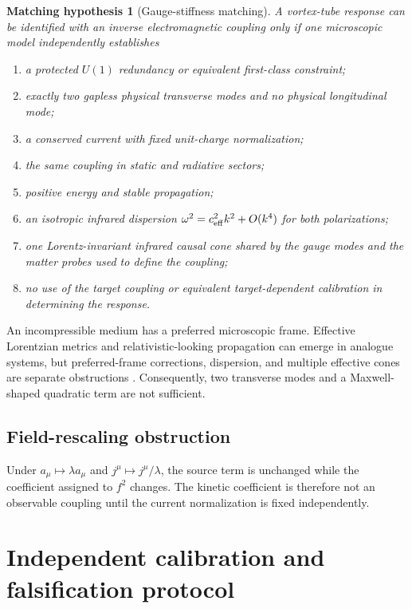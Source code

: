 \documentclass[aps,pre,preprint,notitlepage,nofootinbib,superscriptaddress]{revtex4-2}
\newtheorem{hypothesis}{Matching hypothesis}
\begin{document}
\begin{hypothesis}[Gauge-stiffness matching]
A vortex-tube response can be identified with an inverse electromagnetic coupling only if one microscopic model independently establishes
\begin{enumerate}[label=(\alph*)]
  \item a protected $U(1)$ redundancy or equivalent first-class constraint;
  \item exactly two gapless physical transverse modes and no physical longitudinal mode;
  \item a conserved current with fixed unit-charge normalization;
  \item the same coupling in static and radiative sectors;
  \item positive energy and stable propagation;
  \item an isotropic infrared dispersion $\omega^2=c_{\rm eff}^2k^2+O(k^4)$ for both polarizations;
  \item one Lorentz-invariant infrared causal cone shared by the gauge modes and the matter probes used to define the coupling;
  \item no use of the target coupling or equivalent target-dependent calibration in determining the response.
\end{enumerate}
\end{hypothesis}

An incompressible medium has a preferred microscopic frame.  Effective Lorentzian metrics and relativistic-looking propagation can emerge in analogue systems, but preferred-frame corrections, dispersion, and multiple effective cones are separate obstructions \cite{BarceloLiberatiVisser2026}.  Consequently, two transverse modes and a Maxwell-shaped quadratic term are not sufficient.

\subsection{Field-rescaling obstruction}

Under $a_\mu\mapsto\lambda a_\mu$ and $j^\mu\mapsto j^\mu/\lambda$, the source term is unchanged while the coefficient assigned to $f^2$ changes.  The kinetic coefficient is therefore not an observable coupling until the current normalization is fixed independently.

\section{Independent calibration and falsification protocol}
\label{sec:calibration}
\end{document}
